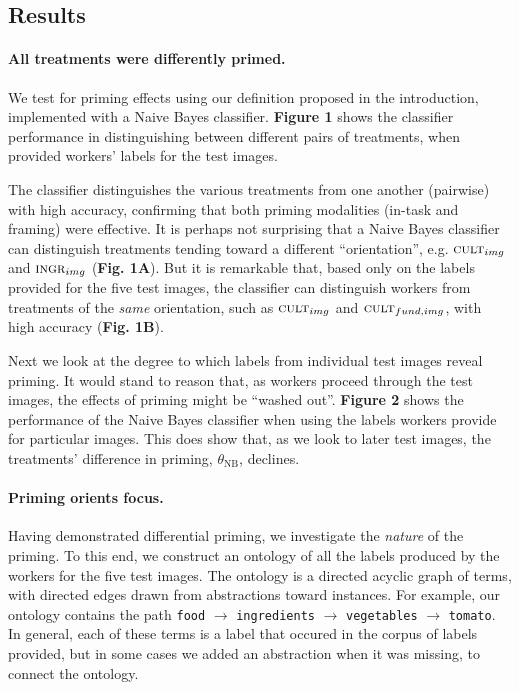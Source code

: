 \documentclass[a4paper]{report}
\begin{document}
\subsection*{Results}
\paragraph{All treatments were differently primed.}
We test for priming effects using our definition proposed in the introduction,
implemented with a Naive Bayes classifier.  \textbf{Figure 1} shows
the classifier performance in distinguishing between different pairs of 
treatments, when provided workers' labels for the test images.

The classifier distinguishes the various treatments from one another (pairwise)
with high accuracy, confirming that both priming modalities 
(in-task and framing) were effective.  It is perhaps not surprising that
a Naive Bayes classifier can distinguish treatments tending toward a different 
``orientation'', e.g. $\textsc{cult}_{img}$ and $\textsc{ingr}_{img}$
(\textbf{Fig. 1A}).
But it is remarkable that, based only on the labels provided for the five test 
images, the classifier can distinguish workers from treatments of the 
\textit{same} orientation, such as $\textsc{cult}_{img}$ and 
$\textsc{cult}_{fund, img}$, with high accuracy (\textbf{Fig. 1B}).

Next we look at the degree to which labels from individual test images reveal 
priming.  It would stand to reason that, as workers proceed through 
the test images, the effects of priming might be ``washed out''.  
\textbf{Figure 2} shows the
performance of the Naive Bayes classifier when using the labels workers provide
for particular images.  This does show that, as we look to later test images, 
the treatments' difference in priming, $\theta_\text{NB}$, declines.  

\paragraph{Priming orients focus.} Having demonstrated differential 
priming, we investigate the \textit{nature} of the priming.  To this
end, we construct an ontology of all the labels produced by the workers
for the five test images.  The ontology is a directed acyclic graph of terms,
with directed edges drawn from abstractions toward instances.  For example,
our ontology contains the path \texttt{food} $\to$ \texttt{ingredients} $\to$ 
\texttt{vegetables} 
$\to$ \texttt{tomato}.  In general, each of these terms is a label that
occured in the corpus of labels provided, but in some cases we added 
an abstraction when it was missing, to connect the ontology.
\end{document}
